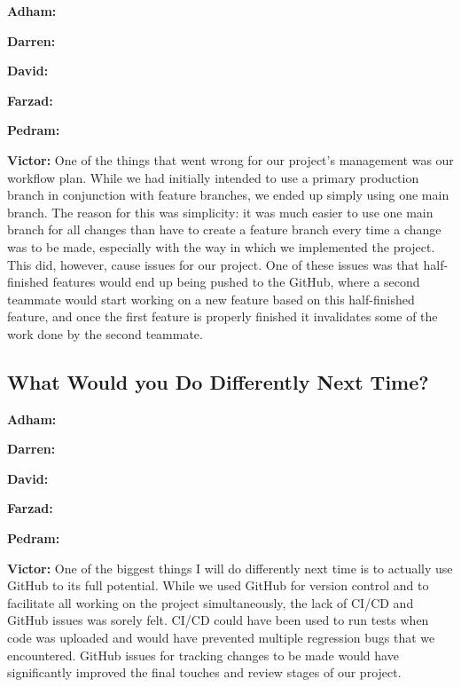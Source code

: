 \documentclass{article}
\begin{document}
\textbf{Adham:}

\textbf{Darren:}

\textbf{David:}

\textbf{Farzad:}

\textbf{Pedram:}

\textbf{Victor:} One of the things that went wrong for our project's management was our workflow plan. While we had initially intended to use a primary production branch in conjunction with feature branches, we ended up simply using one main branch. The reason for this was simplicity: it was much easier to use one main branch for all changes than have to create a feature branch every time a change was to be made, especially with the way in which we implemented the project. This did, however, cause issues for our project. One of these issues was that half-finished features would end up being pushed to the GitHub, where a second teammate would start working on a new feature based on this half-finished feature, and once the first feature is properly finished it invalidates some of the work done by the second teammate.

\subsection{What Would you Do Differently Next Time?}

\textbf{Adham:}

\textbf{Darren:}

\textbf{David:}

\textbf{Farzad:}

\textbf{Pedram:}

\textbf{Victor:} One of the biggest things I will do differently next time is to actually use GitHub to its full potential. While we used GitHub for version control and to facilitate all working on the project simultaneously, the lack of CI/CD and GitHub issues was sorely felt. CI/CD could have been used to run tests when code was uploaded and would have prevented multiple regression bugs that we encountered. GitHub issues for tracking changes to be made would have significantly improved the final touches and review stages of our project.
\end{document}
